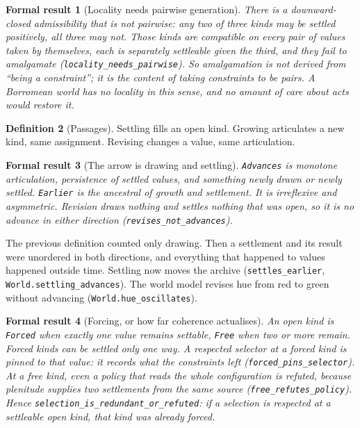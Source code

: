 \documentclass[11pt]{article}
\newtheorem{formalresult}{Formal result}[section]
\theoremstyle{definition}
\newtheorem{definition}[formalresult]{Definition}
\newcommand{\lean}[1]{\nolinkurl{#1}}
\begin{document}
\begin{formalresult}[Locality needs pairwise generation]
There is a downward-closed admissibility that is not pairwise: any two
of three kinds may be settled positively, all three may not. Those
kinds are compatible on every pair of values taken by themselves, each
is separately settleable given the third, and they fail to amalgamate
(\lean{locality\_needs\_pairwise}). So amalgamation is not derived from
``being a constraint''; it is the content of taking constraints to be
pairs. A Borromean world has no locality in this sense, and no amount
of care about acts would restore it.
\end{formalresult}

\begin{definition}[Passages]
Settling fills an open kind. Growing articulates a new kind, same
assignment. Revising changes a value, same articulation.
\end{definition}

\begin{formalresult}[The arrow is drawing and settling]
\lean{Advances} is monotone articulation, persistence of settled
values, and something newly drawn or newly settled.
\lean{Earlier} is the ancestral of growth and settlement. It is
irreflexive and asymmetric. Revision draws nothing and settles nothing
that was open, so it is no advance in either direction
(\lean{revises\_not\_advances}).
\end{formalresult}

The previous definition counted only drawing. Then a settlement and
its result were unordered in both directions, and everything that
happened to values happened outside time. Settling now moves the
archive (\lean{settles\_earlier}, \lean{World.settling\_advances}).
The world model revises hue from red to green without advancing
(\lean{World.hue\_oscillates}).

\begin{formalresult}[Forcing, or how far coherence actualises]
An open kind is \lean{Forced} when exactly one value remains
settable, \lean{Free} when two or more remain. Forced kinds can be
settled only one way. A respected selector at a forced kind is pinned
to that value: it records what the constraints left
(\lean{forced\_pins\_selector}). At a free kind, even a policy that
reads the whole configuration is refuted, because plenitude supplies
two settlements from the same source (\lean{free\_refutes\_policy}).
Hence \lean{selection\_is\_redundant\_or\_refuted}: if a selection is
respected at a settleable open kind, that kind was already forced.
\end{formalresult}
\end{document}
